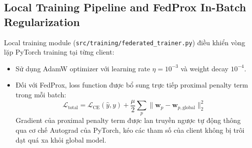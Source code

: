 \subsection{Local Training Pipeline and FedProx In-Batch Regularization}
Local training module (\texttt{src/training/federated\_trainer.py}) điều khiển vòng lặp PyTorch training tại từng client:
\begin{itemize}
    \item Sử dụng AdamW optimizer với learning rate $\eta = 10^{-3}$ và weight decay $10^{-4}$.
    \item Đối với FedProx, loss function được bổ sung trực tiếp proximal penalty term trong mỗi batch:
    \begin{equation}
        \mathcal{L}_{\text{total}} = \mathcal{L}_{\text{CE}}(\hat{y}, y) + \frac{\mu}{2} \sum_{p} \|\mathbf{w}_p - \mathbf{w}_{p, \text{global}}\|_2^2
    \end{equation}
    Gradient của proximal penalty term được lan truyền ngược tự động thông qua cơ chế Autograd của PyTorch, kéo các tham số của client không bị trôi dạt quá xa khỏi global model.
\end{itemize}
